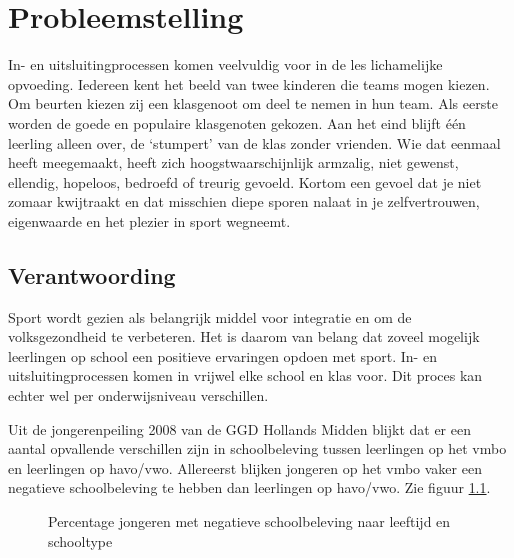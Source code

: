 \documentclass[a4paper,12pt]{memoir}
\begin{document}
\chapter{Probleemstelling}

In- en uitsluitingprocessen komen veelvuldig voor in de les lichamelijke opvoeding. Iedereen kent het beeld van twee kinderen die teams mogen kiezen. Om beurten kiezen zij een klasgenoot om deel te nemen in hun team. Als eerste worden de goede en populaire klasgenoten gekozen. Aan het eind blijft één leerling alleen over, de `stumpert' van de klas zonder vrienden. Wie dat eenmaal heeft meegemaakt, heeft zich hoogstwaarschijnlijk armzalig, niet gewenst, ellendig, hopeloos, bedroefd of treurig gevoeld. Kortom een gevoel dat je niet zomaar kwijtraakt en dat misschien diepe sporen nalaat in je zelfvertrouwen, eigenwaarde en het plezier in sport wegneemt.

\section{Verantwoording}

Sport wordt gezien als belangrijk middel voor integratie en om de volksgezondheid te verbeteren. Het is daarom van belang dat zoveel mogelijk leerlingen op school een positieve ervaringen opdoen met sport. In- en uitsluitingprocessen komen in vrijwel elke school en klas voor. Dit proces kan echter wel per onderwijsniveau verschillen.

Uit de jongerenpeiling 2008 van de GGD Hollands Midden \parencite{ggd} blijkt dat er een aantal opvallende verschillen zijn in schoolbeleving tussen leerlingen op het vmbo en leerlingen op havo/vwo. Allereerst blijken jongeren op het vmbo vaker een negatieve schoolbeleving te hebben dan leerlingen op havo/vwo. Zie figuur \ref{grafiek}. 

\begin{figure}
\centering
{}
\caption{Percentage jongeren met negatieve schoolbeleving naar leeftijd en schooltype \parencite{ggd}}
\label{grafiek}
\end{figure}
\end{document}
